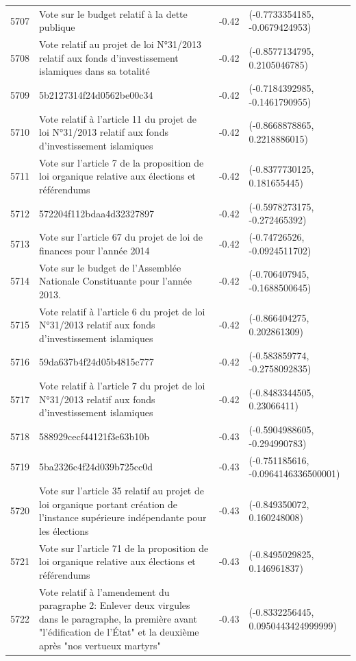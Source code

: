 \begin{table}[ht]
\begin{tabular}{rlrl}
  5707 & Vote sur le budget relatif à la dette publique & -0.42 & (-0.7733354185, -0.0679424953) \\ 
  5708 & Vote relatif au projet de loi N°31/2013 relatif aux fonds d'investissement islamiques dans sa totalité & -0.42 & (-0.8577134795, 0.2105046785) \\ 
  5709 & 5b2127314f24d0562be00c34 & -0.42 & (-0.7184392985, -0.1461790955) \\ 
  5710 & Vote relatif à l'article 11 du projet de loi N°31/2013 relatif aux fonds d'investissement islamiques & -0.42 & (-0.8668878865, 0.2218886015) \\ 
  5711 & Vote sur l'article 7 de la proposition de loi organique relative aux élections et référendums & -0.42 & (-0.8377730125, 0.181655445) \\ 
  5712 & 572204f112bdaa4d32327897 & -0.42 & (-0.5978273175, -0.272465392) \\ 
  5713 & Vote sur l'article 67 du projet de loi de finances pour l'année 2014 & -0.42 & (-0.74726526, -0.0924511702) \\ 
  5714 & Vote sur le budget de l'Assemblée Nationale Constituante pour l'année 2013. & -0.42 & (-0.706407945, -0.1688500645) \\ 
  5715 & Vote relatif à l'article 6 du projet de loi N°31/2013 relatif aux fonds d'investissement islamiques & -0.42 & (-0.866404275, 0.202861309) \\ 
  5716 & 59da637b4f24d05b4815c777 & -0.42 & (-0.583859774, -0.2758092835) \\ 
  5717 & Vote relatif à l'article 7 du projet de loi N°31/2013 relatif aux fonds d'investissement islamiques & -0.42 & (-0.8483344505, 0.23066411) \\ 
  5718 & 588929cecf44121f3e63b10b & -0.43 & (-0.5904988605, -0.294990783) \\ 
  5719 & 5ba2326c4f24d039b725cc0d & -0.43 & (-0.751185616, -0.0964146336500001) \\ 
  5720 & Vote sur l'article 35 relatif au projet de loi organique portant création de l'instance supérieure indépendante pour les élections & -0.43 & (-0.849350072, 0.160248008) \\ 
  5721 & Vote sur l'article 71 de la proposition de loi organique relative aux élections et référendums & -0.43 & (-0.8495029825, 0.146961837) \\ 
  5722 & Vote relatif à l'amendement du paragraphe 2: Enlever deux virgules dans le paragraphe, la première avant "l’édification de l’État" et la deuxième après "nos vertueux martyrs" & -0.43 & (-0.8332256445, 0.0950443424999999) \\ 

\end{tabular}
\end{table}
